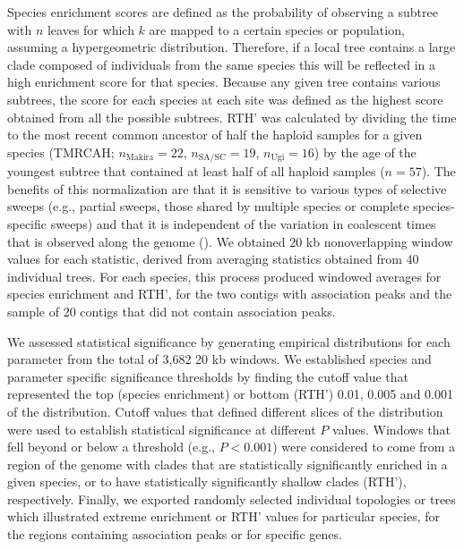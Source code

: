 Species enrichment scores are defined as the probability of observing a subtree with $n$ leaves for which $k$ are mapped to a certain species or population, assuming a hypergeometric distribution. Therefore, if a local tree contains a large clade composed of individuals from the same species this will be reflected in a high enrichment score for that species. Because any given tree contains various subtrees, the score for each species at each site was defined as the highest score obtained from all the possible subtrees. \acs{RTH}’ was calculated by dividing the time to the most recent common ancestor of half the haploid samples for a given species (TMRCAH; $n_{\mathrm{Makira}} = 22$, $n_{\mathrm{SA/SC}} = 19$, $n_{\mathrm{Ugi}} = 16$) by the age of the youngest subtree that contained at least half of all haploid samples ($n = 57$). The benefits of this normalization are that it is sensitive to various types of selective sweeps (e.g., partial sweeps, those shared by multiple species or complete species-specific sweeps) and that it is independent of the variation in coalescent times that is observed along the genome (\cite{hejase_genomic_2020}). We obtained 20 kb nonoverlapping window values for each statistic, derived from averaging statistics obtained from 40 individual trees. For each species, this process produced windowed averages for species enrichment and \acs{RTH}’, for the two contigs with association peaks and the sample of 20 contigs that did not contain association peaks.

We assessed statistical significance by generating empirical distributions for each parameter from the total of 3,682 20 kb windows. We established species and parameter specific significance thresholds by finding the cutoff value that represented the top (species enrichment) or bottom (\acs{RTH}’) 0.01, 0.005 and 0.001 of the distribution. Cutoff values that defined different slices of the distribution were used to establish statistical significance at different $P$ values. Windows that fell beyond or below a threshold (e.g., $P<0.001$) were considered to come from a region of the genome with clades that are statistically significantly enriched in a given species, or to have statistically significantly shallow clades (\acs{RTH}’), respectively. Finally, we exported randomly selected individual topologies or trees which illustrated extreme enrichment or \acs{RTH}’ values for particular species, for the regions containing association peaks or for specific genes.

